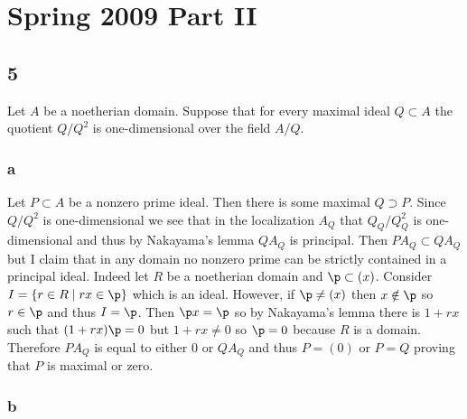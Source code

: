 \documentclass[12pt]{article}
\begin{document}
\tableofcontents

\section{Spring 2009 Part II}

\subsection{5}

Let $A$ be a noetherian domain. Suppose that for every maximal ideal $Q \subset A$ the quotient $Q / Q^2$ is one-dimensional over the field $A / Q$.

\subsubsection{a}

Let $P \subset A$ be a nonzero prime ideal. Then there is some maximal $Q \supset P$. Since $Q / Q^2$ is one-dimensional we see that in the localization $A_Q$ that $Q_Q / Q_Q^2$ is one-dimensional and thus by Nakayama's lemma $Q A_Q$ is principal. Then $P A_Q \subset Q A_Q$ but I claim that in any domain no nonzero prime can be strictly contained in a principal ideal. Indeed let $R$ be a noetherian domain and $\p \subset (x)$. Consider $I = \{ r \in R \mid rx \in \p \}$ which is an ideal. However, if $\p \neq (x)$ then $x \notin \p$ so $r \in \p$ and thus $I = \p$. Then $\p x = \p$ so by Nakayama's lemma there is $1 + rx$ such that $(1 + rx) \p = 0$ but $1 + rx \neq 0$ so $\p = 0$ because $R$ is a domain. Therefore $P A_Q$ is equal to either $0$ or $Q A_Q$ and thus $P = (0)$ or $P = Q$ proving that $P$ is maximal or zero.

\subsubsection{b}
\end{document}
